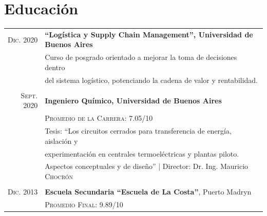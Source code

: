 \documentclass[a4paper,10pt]{article}
\begin{document}
\section{Educación}\smallskip
\begin{tabular}{rl}	
\textsc{Dic.} 2020& \textbf{``Logística y Supply Chain Management'', Universidad de Buenos Aires} \\ & Curso de posgrado orientado a mejorar la toma de decisiones dentro \\ & del sistema logístico, potenciando la cadena de valor y rentabilidad.\\\\
\textsc{Sept.} 2020 & \textbf{Ingeniero Químico,  Universidad de Buenos Aires}\\
&\small\textsc{Promedio de la Carrera:} 7.05/10\\
& Tesis: ``Los circuitos cerrados para transferencia de energía, aislación y\\& experimentación en centrales termoeléctricas y plantas piloto.\\& Aspectos conceptuales y de diseño'' | \small Director: Dr. Ing. Mauricio \textsc{Chocrón}\\\\
\textsc{Dic.} 2013& \textbf{Escuela Secundaria ``Escuela de La Costa''}, Puerto Madryn\\ &\small\textsc{Promedio Final:} 9.89/10
\end{tabular}\smallskip

\end{document}
